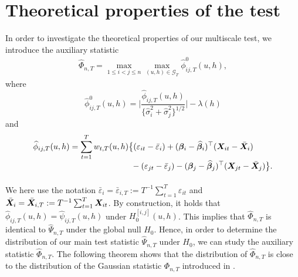 \documentclass[a4paper,12pt]{article}
\makeatletter
\renewcommand{\eqref}[1]{\tagform@{\ref{#1}}}
\makeatother
\begin{document}
\section{Theoretical properties of the test}\label{sec:theo}


In order to investigate the theoretical properties of our multiscale test, we introduce the auxiliary statistic
\begin{align}\label{eq:Phi_hat}
\widehat{\Phi}_{n,T} = \max_{1 \le i < j \le n}  \max_{(u, h) \in \mathcal{G}_T} \widehat{\phi}^0_{ij, T}(u, h),
\end{align}
where
\begin{equation*}%
\widehat{\phi}^0_{ij, T}(u, h) =\bigg| \frac{\widehat{\phi}_{ij, T}(u, h)} {\{ \widehat{\sigma}_i^2 + \widehat{\sigma}_j^2 \}^{1/2}} \bigg| - \lambda(h)
\end{equation*}
and
\begin{align*}
\widehat{\phi}_{ij, T}(u, h) 
 & = \sum_{t=1}^T w_{t,T}(u, h) \big\{ (\varepsilon_{it} - \bar{\varepsilon}_i) + (\bfbeta_i - \widehat{\bfbeta}_i)^\top (\X_{it} - \bar{\X}_{i}) \\[-0.4cm]
 & \phantom{= \sum_{t=1}^T w_{t,T}(u, h) \big\{} - (\varepsilon_{jt} - \bar{\varepsilon}_j) -  (\bfbeta_j - \widehat{\bfbeta}_j)^\top (\X_{jt} - \bar{\X}_{j}) \big\}.
\end{align*}
We here use the notation $\bar{\varepsilon}_i = \bar{\varepsilon}_{i,T} := T^{-1} \sum_{t=1}^T \varepsilon_{it}$ and $\bar{\boldsymbol{X}}_{i} =  \bar{\boldsymbol{X}}_{i, T} := T^{-1}\sum_{t=1}^T  \boldsymbol{X}_{it}$. By construction, it holds that $\widehat{\phi}_{ij, T}(u, h) = \widehat{\psi}_{ij, T}(u, h)$ under $H_0^{[i, j]}(u, h)$. This implies that $\widehat{\Phi}_{n,T}$ is identical to $\widehat{\Psi}_{n,T}$ under the global null $H_0$. Hence, in order to determine the distribution of our main test statistic $\widehat{\Psi}_{n,T}$ under $H_0$, we can study the auxiliary statistic $\widehat{\Phi}_{n,T}$. The following theorem shows that the distribution of $\widehat{\Phi}_{n,T}$ is close to the distribution of the Gaussian statistic $\Phi_{n,T}$ introduced in \eqref{eq:Phi}. 


\end{document}
